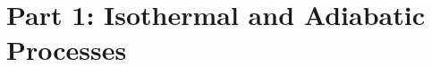 ﻿\documentclass[12pt, letterpaper]{article}
\begin{document}
    \section*{Part 1: Isothermal and Adiabatic Processes}
\end{document}
